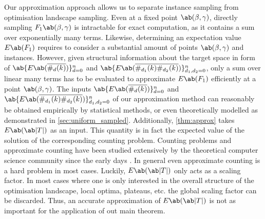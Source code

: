 Our approximation approach allows us to separate instance sampling from optimisation landscape sampling. Even at a fixed point $\ab(\mangle, \pangle)$, directly sampling $F_1 \ab(\mangle,\pangle)$ is intractable for
exact computation, as it contains a sum over exponentially many terms. Likewise, determining an expectation value $E\ab(F_1)$ requires to consider a substantial amount of points $\ab(\mangle, \pangle)$ and instances. However, given structural information about the target space in form of $\ab\{E\ab(\overline{\#_d (k)})\}_{d=0}^n$ and $\ab\{E\ab(\overline{\#_{d_1} (k) \#_{d_2} (k)})\}_{d_1, d_2 = 0}^n$, only a sum over linear many terms has to be evaluated to approximate $E\ab(F_1)$ efficiently at a point $\ab(\mangle, \pangle)$. The inputs $\ab\{E\ab(\overline{\#_d (k)})\}_{d=0}^n$ and $\ab\{E\ab(\overline{\#_{d_1} (k) \#_{d_2} (k)})\}_{d_1, d_2 = 0}^n$ of our approximation method can reasonably be obtained empirically by statistical methods, or even theoretically modelled as demonstrated in \cref{sec:uniform_sampled}. Additionally, \cref{thm:approx} takes $E\ab(\ab|T|)$ as an input. This quantity is in fact the expected value of the solution of the corresponding counting problem. Counting problems and approximate counting have been studied extensively by the theoretical computer science community since the early days \cite{stockmeyer1983complexity,dyer2003approximate,wei2005new}. In general even approximate counting is a hard problem in most cases. Luckily, $E\ab(\ab|T|)$ only acts as a scaling factor. In most cases where one is only interested in the overall structure of the optimisation landscape, \ie local optima, plateaus, etc. the global scaling factor can be discarded. Thus, an accurate approximation of $E\ab(\ab|T|)$ is not as important for the application of out main theorem.


